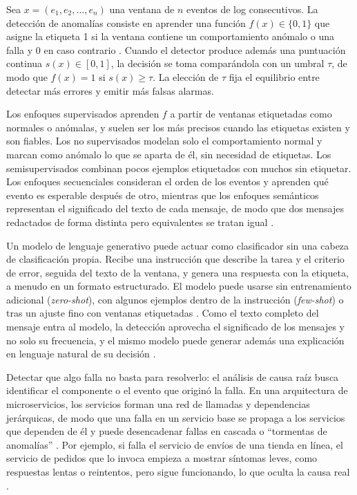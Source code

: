 
Sea $x = (e_1, e_2, \ldots, e_n)$ una ventana de $n$ eventos de log consecutivos. La detección de anomalías consiste en aprender una función $f(x) \in \{0, 1\}$ que asigne la etiqueta 1 si la ventana contiene un comportamiento anómalo o una falla y 0 en caso contrario \cite{he2021_survey}. Cuando el detector produce además una puntuación continua $s(x) \in [0, 1]$, la decisión se toma comparándola con un umbral $\tau$, de modo que $f(x) = 1$ si $s(x) \geq \tau$. La elección de $\tau$ fija el equilibrio entre detectar más errores y emitir más falsas alarmas.


Los enfoques supervisados aprenden $f$ a partir de ventanas etiquetadas como normales o anómalas, y suelen ser los más precisos cuando las etiquetas existen y son fiables. Los no supervisados modelan solo el comportamiento normal y marcan como anómalo lo que se aparta de él, sin necesidad de etiquetas. Los semisupervisados combinan pocos ejemplos etiquetados con muchos sin etiquetar. Los enfoques secuenciales consideran el orden de los eventos y aprenden qué evento es esperable después de otro, mientras que los enfoques semánticos representan el significado del texto de cada mensaje, de modo que dos mensajes redactados de forma distinta pero equivalentes se tratan igual \cite{jiang2021_aiops} \cite{he2021_survey}.


Un modelo de lenguaje generativo puede actuar como clasificador sin una cabeza de clasificación propia. Recibe una instrucción que describe la tarea y el criterio de error, seguida del texto de la ventana, y genera una respuesta con la etiqueta, a menudo en un formato estructurado. El modelo puede usarse sin entrenamiento adicional (\textit{zero-shot}), con algunos ejemplos dentro de la instrucción (\textit{few-shot}) o tras un ajuste fino con ventanas etiquetadas \cite{liu2024_logprompt}. Como el texto completo del mensaje entra al modelo, la detección aprovecha el significado de los mensajes y no solo su frecuencia, y el mismo modelo puede generar además una explicación en lenguaje natural de su decisión \cite{lim2025_logadreft}.

Detectar que algo falla no basta para resolverlo: el análisis de causa raíz busca identificar el componente o el evento que originó la falla. En una arquitectura de microservicios, los servicios forman una red de llamadas y dependencias jerárquicas, de modo que una falla en un servicio base se propaga a los servicios que dependen de él y puede desencadenar fallas en cascada o ``tormentas de anomalías'' \cite{wang2024_rca}. Por ejemplo, si falla el servicio de envíos de una tienda en línea, el servicio de pedidos que lo invoca empieza a mostrar síntomas leves, como respuestas lentas o reintentos, pero sigue funcionando, lo que oculta la causa real \cite{pedroso2025_maia}.

